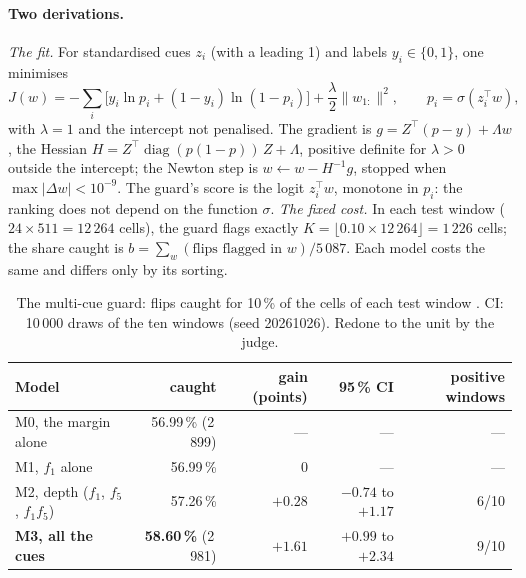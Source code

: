 \paragraph{Two derivations.} \emph{The fit.} For standardised cues $z_i$ (with a leading 1) and labels $y_i \in \{0, 1\}$, one minimises
\begin{equation}\label{t3tro:eq:logistique}
J(w) = -\sum_i \bigl[y_i \ln p_i + (1 - y_i)\ln(1 - p_i)\bigr] + \frac{\lambda}{2}\lVert w_{1:}\rVert^2, \qquad p_i = \sigma(z_i^\top w),
\end{equation}
with $\lambda = 1$ and the intercept not penalised. The gradient is $g = Z^\top(p - y) + \Lambda w$, the Hessian $H = Z^\top \operatorname{diag}(p(1-p))\,Z + \Lambda$, positive definite for $\lambda > 0$ outside the intercept; the Newton step is $w \leftarrow w - H^{-1}g$, stopped when $\max|\Delta w| < 10^{-9}$. The guard's score is the logit $z_i^\top w$, monotone in $p_i$: the ranking does not depend on the function $\sigma$. \emph{The fixed cost.} In each test window ($24 \times 511 = 12\,264$ cells), the guard flags exactly $K = \lfloor 0.10 \times 12\,264\rfloor = 1\,226$ cells; the share caught is $b = \sum_w (\text{flips flagged in } w)/5\,087$. Each model costs the same and differs only by its sorting.

\begin{table}[tbp]
\centering\small
\caption[The multi-cue guard]{The multi-cue guard: flips caught for 10\,\% of the cells of each test window \mes. CI: 10\,000 draws of the ten windows (seed 20261026). Redone to the unit by the judge.}
\label{t3tro:tab:indices}
\begin{tabular}{@{}lrrrr@{}}
\toprule
Model & caught & gain (points) & 95\,\% CI & positive windows \\
\midrule
M0, the margin alone & 56.99\,\% (2\,899) & --- & --- & --- \\
M1, $f_1$ alone & 56.99\,\% & 0 & --- & --- \\
M2, depth ($f_1$, $f_5$, $f_1 f_5$) & 57.26\,\% & $+0.28$ & $-0.74$ to $+1.17$ & 6/10 \\
\textbf{M3, all the cues} & \textbf{58.60\,\%} (2\,981) & $\mathbf{+1.61}$ & $+0.99$ to $+2.34$ & 9/10 \\
\bottomrule
\end{tabular}
\end{table}

